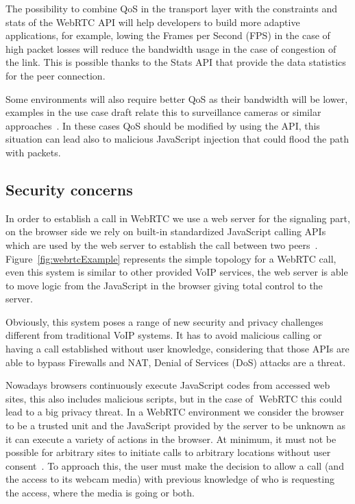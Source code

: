 The possibility to combine QoS in the transport layer with the constraints and stats of the WebRTC API will help developers to build more adaptive applications, for example, lowing the Frames per Second (FPS) in the case of high packet losses will reduce the bandwidth usage in the case of congestion of the link. This is possible thanks to the Stats API that provide the data statistics for the peer connection.

Some environments will also require better QoS as their bandwidth will be lower, examples in the use case draft relate this to surveillance cameras or similar approaches~\cite{WebRTCcasesIETF}. In these cases QoS should be modified by using the API, this situation can lead also to malicious JavaScript injection that could flood the path with packets. 

\subsection{Security concerns}

In order to establish a call in WebRTC we use a web server for the signaling part, on the browser side we rely on built-in standardized JavaScript calling APIs which are used by the web server to establish the call between two peers~\cite{WebRTCcasesIETF}. Figure~\ref{fig:webrtcExample} represents the simple topology for a WebRTC call, even this system is similar to other provided VoIP services, the web server is able to move logic from the JavaScript in the browser giving total control to the server.

Obviously, this system poses a range of new security and privacy challenges different from traditional VoIP systems. It has to avoid malicious calling or having a call established without user knowledge, considering that those APIs are able to bypass Firewalls and NAT, Denial of Services (DoS) attacks are a threat.

Nowadays browsers continuously execute JavaScript codes from accessed web sites, this also includes malicious scripts, but in the case of WebRTC this could lead to a big privacy threat. In a WebRTC environment we consider the browser to be a trusted unit and the JavaScript provided by the server to be unknown as it can execute a variety of actions in the browser. At minimum, it must not be possible for arbitrary sites to initiate calls to arbitrary locations without user consent~\cite{rtcwebSecurityIETF}. To approach this, the user must make the decision to allow a call (and the access to its webcam media) with previous knowledge of who is requesting the access, where the media is going or both.

